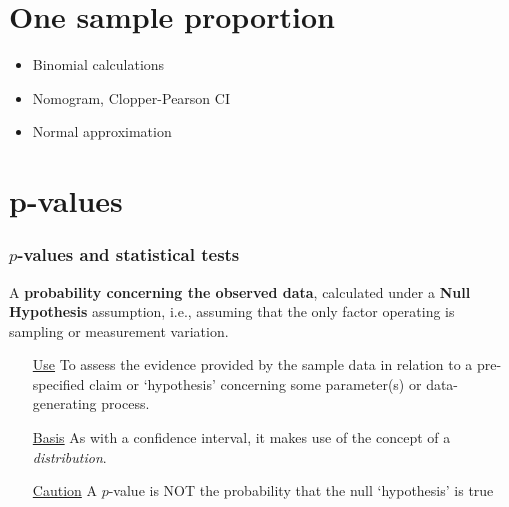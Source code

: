 \documentclass[10pt]{beamer}\usepackage[]{graphicx}\usepackage[]{color}
\begin{document}
\section{One sample proportion}

\begin{frame}
	\begin{itemize}
		\item Binomial calculations
		\item Nomogram, Clopper-Pearson CI
		\item Normal approximation
	\end{itemize}
\end{frame}


\section{p-values}

\begin{frame}
	\frametitle{$p$-values and statistical tests}
	
	
	\begin{defm}[$p$-value]
		A \textbf{probability concerning the observed data}, calculated under a \textbf{Null Hypothesis} assumption, i.e., assuming that the only factor operating is sampling or measurement variation. 
	\end{defm}
	
	\begin{itemize} 
		\item[\underline{Use}] To assess the evidence provided by the sample data
		in relation to a pre-specified claim or `hypothesis' concerning some parameter(s) or data-generating process. 
		\item[\underline{Basis}] As with a confidence interval, it makes use of the concept of a \textit{distribution}. 
		\item[\underline{Caution}] A $p$-value is NOT the probability that the null `hypothesis' is true
	\end{itemize}
\end{frame}
\end{document}
